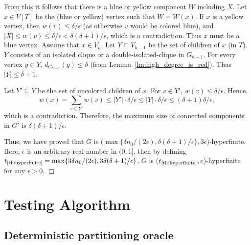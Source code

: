 \documentclass[11pt]{article}
\newcommand{\qed}{\hspace*{\fill} $\Box$}
\begin{document}
From this it follows that there is a blue or yellow component $W$ including $X$. 
Let $x \in V[T]$ be the (blue or yellow) vertex 
such that $W = W(x)$. 
If $x$ is a yellow vertex, 
then $w(v) \leq \delta / \epsilon$ 
(as otherwise $v$ would be colored blue), and $|X| \leq w(v) \leq \delta / \epsilon < \delta (\delta+1) /\epsilon$, which is a contradiction.  
Thus $x$ must be a blue vertex. 
Assume that $x \in V_h$. 
Let $Y \subseteq V_{h-1}$ be the set of children of $x$ (in $T$). 
$Y$ consists of an isolated clique or 
a double-isolated-clique in $G_{h-1}$. 
For every vertex $y \in Y$,  $d_{G_{h-1}}(y) \leq \delta$ 
(from Lemma~\ref{lm:high_degree_is_red}). 
Thus $|Y| \leq \delta+1$. 

Let $Y' \subseteq Y$ be the set of uncolored children of $x$. 
For $v \in Y'$, $w(v) \leq \delta/\epsilon$. 
Hence, 
$$
w(x) = \sum_{v \in Y'} w(v) \leq |Y'| \cdot \delta/\epsilon 
\leq |Y| \cdot \delta/\epsilon
\leq (\delta +1) \delta / \epsilon,
$$ 
which is a contradiction. 
Therefore, the maximum size of connected components in $G'$ is $\delta (\delta+1) /\epsilon$. 




Thus, we have proved that $G$ is 
($\max \{ \delta n_0/(2 \epsilon), \delta (\delta+1) /\epsilon \}, 3 \epsilon$)-hyperfinite. 
Here, $\epsilon$ is an arbitrary real number in $(0,1]$, 
then by defining 
$t_{\mbox{\scriptsize \ref{th:hyperfinite}}} 
= \max \{ 3 \delta n_0 / (2 \epsilon), 3 \delta (\delta+1) /\epsilon \}$, 
$G$ is 
($t_{\mbox{\scriptsize \ref{th:hyperfinite}}}, \epsilon$)-hyperfinite 
for any $\epsilon >0$. \qed\\











\section{Testing Algorithm}



\subsection{Deterministic partitioning oracle}
\end{document}
